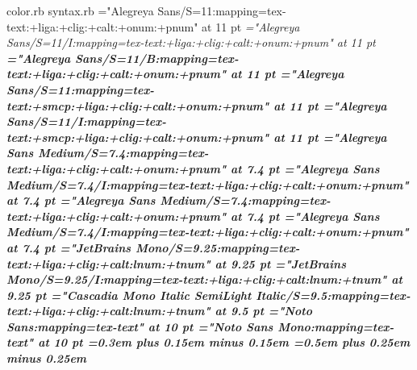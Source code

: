  color.rb
 syntax.rb
%
\def\ldfont     #1#2#3{"#1/S=#2:mapping=tex-text#3"          at #2 pt}%
\def\ldifont    #1#2#3{"#1/S=#2/I:mapping=tex-text#3"        at #2 pt}%
\def\ldbfont    #1#2#3{"#1/S=#2/B:mapping=tex-text#3"        at #2 pt}%
\def\ldbifont   #1#2#3{"#1/S=#2/BI:mapping=tex-text#3"       at #2 pt}%
\def\ldcapfont  #1#2#3{"#1/S=#2:mapping=tex-text:+smcp#3"    at #2 pt}%
\def\ldicapfont #1#2#3{"#1/S=#2/I:mapping=tex-text:+smcp#3"  at #2 pt}%
\def\ldbcapfont #1#2#3{"#1/S=#2/B:mapping=tex-text:+smcp#3"  at #2 pt}%
\def\ldbicapfont#1#2#3{"#1/S=#2/BI:mapping=tex-text:+smcp#3" at #2 pt}%
%
\def\basefamily{Alegreya Sans}%
\def\basesize{11}%
\def\basefeat{:+liga:+clig:+calt:+onum:+pnum}%
\font\rm  =\ldfont    {\basefamily}{\basesize}{\basefeat}%
\font\it  =\ldifont   {\basefamily}{\basesize}{\basefeat}%
\font\bf  =\ldbfont   {\basefamily}{\basesize}{\basefeat}%
\font\caps=\ldcapfont {\basefamily}{\basesize}{\basefeat}%
\font\icap=\ldicapfont{\basefamily}{\basesize}{\basefeat}%
%
\def\supfamily{Alegreya Sans Medium}%
\def\supsize{7.4}%
\def\supfeat{:+liga:+clig:+calt:+onum:+pnum}%
\font\suprm=\ldfont {\supfamily}{\supsize}{\supfeat}%
\font\supit=\ldifont{\supfamily}{\supsize}{\supfeat}%
%
\def\sup#1{\raise 0.73ex\hbox{\suprm #1}}%
\def\isup#1{\raise 0.73ex\hbox{\supit #1}}%
%
\def\subfamily{Alegreya Sans Medium}%
\def\subsize{7.4}%
\def\subfeat{:+liga:+clig:+calt:+onum:+pnum}%
\font\subrm=\ldfont {\subfamily}{\subsize}{\subfeat}%
\font\subit=\ldifont{\subfamily}{\subsize}{\subfeat}%
%
\def\sub#1{\lower 0.23ex\hbox{\subrm #1}}%
\def\isub#1{\lower 0.23ex\hbox{\subit #1}}%
%
\def\codefamily{JetBrains Mono}%
\def\codesize{9.25}%
\def\codefeat{:+liga:+clig:+calt:lnum:+tnum}%
%
\font\fw =\ldfont {\codefamily}{\codesize}{\codefeat}%
\font\ifw=\ldifont{\codefamily}{\codesize}{\codefeat}%
%
\font\cas=\ldfont{Cascadia Mono Italic SemiLight Italic}{9.5}{\codefeat}%
%
\def\fs{%
  \spaceskip=0.5em
  \xspaceskip=0.5em
}%
%
\font\noto    ="Noto Sans:mapping=tex-text"      at 10 pt
\font\notomono="Noto Sans Mono:mapping=tex-text" at 10 pt
%
\rm
\spaceskip =0.3em plus 0.15em minus 0.15em
\xspaceskip=0.5em plus 0.25em minus 0.25em
%
\def\lcap#1{%
  \font\localfont=\ldcapfont{\basefamily}{\basesize}{\basefeat:letterspace=#1}%
  \localfont
  \dimen0=0.0625\fontdimen2\localfont
  \multiply\dimen0 by #1
  \advance\dimen0 by \fontdimen2\localfont
  \spaceskip =   \dimen0 plus 0.5\dimen0 minus 0.5\dimen0
  \xspaceskip=1.5\dimen0 plus 0.5\dimen0 minus 0.5\dimen0
}%
